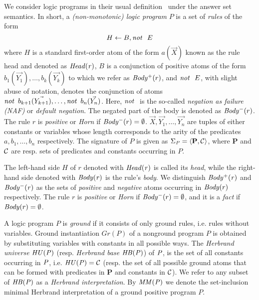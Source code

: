 We consider logic programs in their usual definition~\cite{DBLP:books/sp/Lloyd87} under the answer set semantics. 
In short, a \emph{(non-monotonic) logic program} $P$ is a set of \emph{rules} of the form
\begin{equation}
H\leftarrow B, \mathit{not}~ \ E
\end{equation}
 where $H$ is a standard first-order atom of the form $a(\vec{X})$ known as the rule head and denoted as $\mathit{Head(r)}$, $B$ is a conjunction of positive atoms of the form $b_1(\vec{Y_1}),\dotsc,b_k(\vec{Y_k})$ to which we refer as $\mathit{Body^+}(r)$, and $\mathit{not}~ \ E$, with slight abuse of notation, denotes the conjunction of atoms $\mathit{not}~ \, b_{k+1}(\vec{Y_{k+1}}),\dotsc,\mathit{not}~ \, b_n(\vec{Y_{n}})$. Here, $\naf$ is the so-called \emph{negation as failure (NAF)} or \emph{default negation}. The negated part of the body is denoted as $\mathit{Body^-}(r)$.  The rule $r$ is \emph{positive} or \emph{Horn} if $\mathit{Body^-}(r)=\emptyset$.  $\vec{X},\vec{Y_1},\ldots,\vec{Y_{n}}$ are tuples of either constants or
variables whose length corresponds to the arity of the predicates
$a,b_1,\ldots,b_n$ respectively. The signature of $P$ is given as $\Sigma_{\mathit{P}}=\langle\mathbf{P},\mathcal{C}\rangle$, where $\mathbf{P}$ and $\mathcal{C}$ are resp. sets of predicates and constants occurring in $P$.

The left-hand side $H$ of %
$r$ denoted with $\mathit{Head(r)}$ is called its \emph{head}, while the right-hand side denoted with
$\mathit{Body(r)}$ is the rule's \emph{body}.
We distinguish $\mathit{Body^+(r)}$ and
$\mathit{Body^-(r)}$ as the sets of \emph{positive} and \emph{negative} atoms occurring in
$\mathit{Body}(r)$ respectively. %
The rule $r$ is \emph{positive} or
\emph{Horn} if $\mathit{Body^-}(r)=\emptyset$, and it is a \emph{fact} if
$\mathit{Body}(r)=\emptyset$.

A logic program $P$ is \emph{ground} if it consists of only ground rules, i.e. rules without
variables. Ground instantiation $Gr(P)$ of a nonground program $P$ is obtained by substituting variables with constants in all possible ways. The \emph{Herbrand universe}  $\mathit{HU(P)}$ (resp. \emph{Herbrand base} $\mathit{HB(P)}$) of $\mathit{P}$, is the set of all constants occurring in $\mathit{P}$, i.e.  $\mathit{HU(P)}=\mathcal{C}$ (resp.
the set of all possible ground atoms that can be formed with predicates in $\mathbf{P}$
and constants in $\mathcal{C}$). We refer to any subset of $\mathit{HB(P)}$ as a \emph{Herbrand interpretation}. By $\mathit{MM(P)}$ we denote the set-inclusion minimal Herbrand interpretation of a ground positive program $P$.


